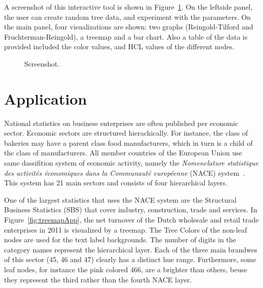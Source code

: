 \documentclass[journal]{vgtc}                %
\begin{document}
A screenshot of this interactive tool is shown in Figure~\ref{fig:screen}. On the leftside panel, the user can create random tree data, and experiment with the parameters. On the main panel, four visualizations are shown: two graphs (Reingold-Tilford and Fruchterman-Reingold), a treemap and a bar chart. Also a table of the data is provided included the color values, and HCL values of the different nodes.

\begin{figure}[htb]
  \centering
  \caption{Screenshot.}\label{fig:screen}
\end{figure}



\section{Application}\label{secapplication}
National statistics on business enterprises are often published per economic sector. Economic sectors are structured hierachically. For instance, the class of bakeries may have a parent class food manufacturers, which in turn is a child of the class of manufacturers. All member countries of the European Union use same dassifition system of economic activity, namely the \textit{Nomenclature statistique des activit\'es \'economiques dans la Communaut\'e europ\'eenne} (NACE) system~\cite{nace}. This system has 21 main sectors and consists of four hierarchical layers.

One of the largest statistics that uses the NACE system are the Structural Business Statistics (SBS) that cover industry, construction, trade and services. In Figure~\ref{fig:treemapApp}, the net turnover of the Dutch wholesale and retail trade enterprises in 2011 is visualized by a treemap. The Tree Colors of the non-leaf nodes are used for the text label backgrounds. The number of digits in the category names represent the hierarchical layer. Each of the three main brandwes of this sector (45, 46 and 47) clearly has a distinct hue range. Furthermore, some leaf nodes, for instance the pink colored 466, are a brighter than others, beuse they represent the third rather than the fourth NACE layer.
\end{document}
